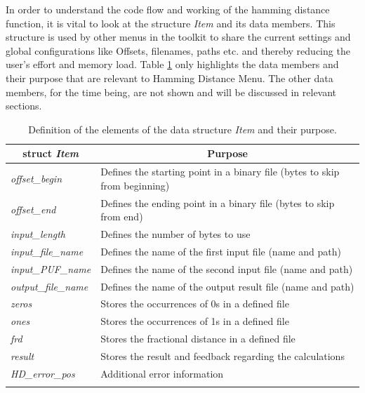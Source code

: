 In order to understand the code flow and working of the hamming distance function, it is vital to look at the structure \emph{Item} and its data members. This structure is used by other menus in the toolkit to share the current settings and global configurations like Offsets, filenames, paths etc. and thereby reducing the user's effort and memory load. Table \ref{table:item} only highlights the data members and their purpose that are relevant to Hamming Distance Menu. The other data
members, for the time being, are not shown and will be discussed in relevant sections.\\

\begin{table}[!ht]
	\begin{center}
		\begin{tabular}{ll}
			\toprule
			\multicolumn{1}{c}{\textbf{struct \emph{Item}}} & \multicolumn{1}{c}{\textbf{Purpose}}\\
			\midrule
			\hline

			\emph{offset\_begin} & Defines the starting point in a binary file (bytes to skip from beginning)\\

			\emph{offset\_end} & Defines the ending point in a binary file (bytes to skip from end)\\

			\emph{input\_length} & Defines the number of bytes to use \\

			\emph{input\_file\_name} & Defines the name of the first input file (name and path)\\

			\emph{input\_PUF\_name} & Defines the name of the second input file (name and path)\\

			\emph{output\_file\_name} & Defines the name of the output result file (name and path)\\

			\emph{zeros} & Stores the occurrences of 0s in a defined file\\

			\emph{ones} & Stores the occurrences of 1s in a defined file\\

			\emph{frd} & Stores the fractional distance in a defined file\\

			\emph{result} & Stores the result and feedback regarding the calculations\\

			\emph{HD\_error\_pos} & Additional error information \\

			\hline
			\addlinespace
			\bottomrule
		\end{tabular}
	\end{center}
	\caption{Definition of the elements of the data structure \emph{Item} and their purpose.}
	\label{table:item}
\end{table}

